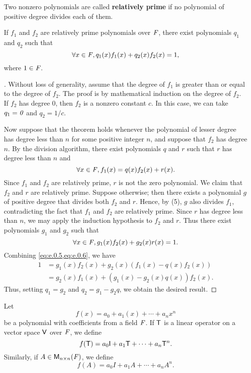 \begin{defn}\label{e.0.6}
	Two nonzero polynomials are called \textbf{relatively prime} if no polynomial of positive degree divides each of them.
\end{defn}

\begin{thm}\label{e.2}
	If \(f_1\) and \(f_2\) are relatively prime polynomials over \(\mathit{F}\), there exist polynomials \(q_1\) and \(q_2\) such that
	\[
		\forall x \in \mathit{F}, q_1(x) f_1(x) + q_2(x) f_2(x) = 1,
	\]
	where \(1 \in \mathit{F}\).
\end{thm}

\begin{proof}[]
	Without loss of generality, assume that the degree of \(f_1\) is greater than or equal to the degree of \(f_2\).
	The proof is by mathematical induction on the degree of \(f_2\).
	If \(f_2\) has degree \(0\), then \(f_2\) is a nonzero constant \(c\).
	In this case, we can take \(q_1 = \mathit{0}\) and \(q_2 = 1 / c\).

	Now suppose that the theorem holds whenever the polynomial of lesser degree has degree less than \(n\) for some positive integer \(n\), and suppose that \(f_2\) has degree \(n\).
	By the division algorithm, there exist polynomials \(q\) and \(r\) such that \(r\) has degree less than \(n\) and
	\begin{equation}\label{eq:e.0.5}
		\forall x \in \mathit{F}, f_1(x) = q(x) f_2(x) + r(x).
	\end{equation}
	Since \(f_1\) and \(f_2\) are relatively prime, \(r\) is not the zero polynomial.
	We claim that \(f_2\) and \(r\) are relatively prime.
	Suppose otherwise;
	then there exists a polynomial \(g\) of positive degree that divides both \(f_2\) and \(r\).
	Hence, by (5), \(g\) also divides \(f_1\), contradicting the fact that \(f_1\) and \(f_2\) are relatively prime.
	Since \(r\) has degree less than \(n\), we may apply the induction hypothesis to \(f_2\) and \(r\).
	Thus there exist polynomials \(g_1\) and \(g_2\) such that
	\begin{equation}\label{eq:e.0.6}
		\forall x \in \mathit{F}, g_1(x) f_2(x) + g_2(x) r(x) = 1.
	\end{equation}
	Combining \cref{eq:e.0.5,eq:e.0.6}, we have
	\begin{align*}
		1 & = g_1(x) f_2(x) + g_2(x) (f_1(x) - q(x) f_2(x))  \\
		  & = g_2(x) f_1(x) + (g_1(x) - g_2(x) q(x)) f_2(x).
	\end{align*}
	Thus, setting \(q_1 = g_2\) and \(q_2 = g_1 - g_2 q\), we obtain the desired result.
\end{proof}

\begin{defn}\label{e.0.7}
	Let
	\[
		f(x) = a_0 + a_1(x) + \cdots + a_n x^n
	\]
	be a polynomial with coefficients from a field \(\mathit{F}\).
	If \(\mathsf{T}\) is a linear operator on a vector space \(\mathsf{V}\) over \(\mathit{F}\), we define
	\[
		f(\T) = a_0 \IT + a_1 \T + \cdots + a_n \T^n.
	\]
	Similarly, if \(A \in \ms[n][n][\F]\), we define
	\[
		f(A) = a_0 I + a_1 A + \cdots + a_n A^n.
	\]
\end{defn}
